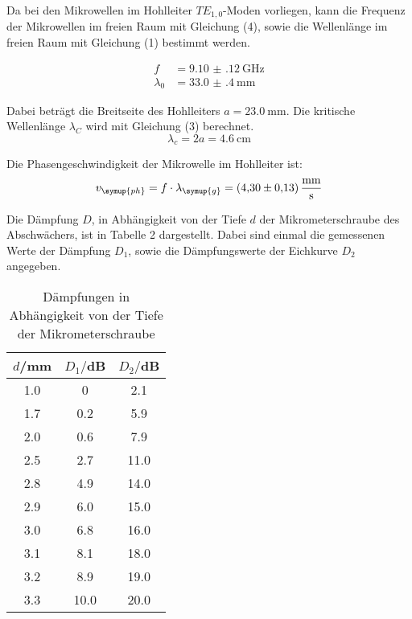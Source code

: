 Da bei den Mikrowellen im Hohlleiter $TE_{1,0}$-Moden vorliegen, kann die Frequenz der
Mikrowellen im freien Raum mit Gleichung (4), sowie die Wellenlänge im freien Raum mit Gleichung (1)
bestimmt werden.

\begin{align*}
  f &= \SI{9.10(12)}{\giga\hertz} \\
  \lambda_{0} &= \SI{33.0(4)}{\milli\meter}
\end{align*}

Dabei beträgt die Breitseite des Hohlleiters $a= \SI{23.0}{\milli\meter}$.
Die kritische Wellenlänge $\lambda_C$ wird mit Gleichung (3) berechnet.
\begin{equation*}
  \lambda_c = 2a = \SI{4.6}{\centi\meter}
\end{equation*}

Die Phasengeschwindigkeit der Mikrowelle im Hohlleiter ist:
\begin{equation*}
  v_{\symup{ph}} = f \cdot \lambda_{\symup{g}} = \SI{4.30(13)}{\milli\meter\per\second}
\end{equation*}

Die Dämpfung $D$, in Abhängigkeit von der Tiefe $d$ der Mikrometerschraube des Abschwächers, ist in Tabelle 2
dargestellt. Dabei sind einmal die gemessenen Werte der Dämpfung $D_1$, sowie die Dämpfungswerte der
Eichkurve $D_2$ angegeben.


\begin{table}[H]
  \centering
  \caption{Dämpfungen in Abhängigkeit von der Tiefe der Mikrometerschraube}
  \label{tab:Parameter}
  \begin{tabular}{c c c}
    \toprule
    $d$/mm & $D_1/$dB & $D_2/$dB\\
    \midrule
    1.0 &  0  & 2.1    \\
    1.7 &  0.2  & 5.9    \\
    2.0 &  0.6  & 7.9    \\
    2.5 &  2.7  & 11.0    \\
    2.8 &  4.9  & 14.0    \\
    2.9 &  6.0  & 15.0    \\
    3.0 &  6.8  & 16.0    \\
    3.1 &  8.1  & 18.0    \\
    3.2 &  8.9  & 19.0    \\
    3.3 &  10.0 & 20.0    \\
    \bottomrule
  \end{tabular}
\end{table}

